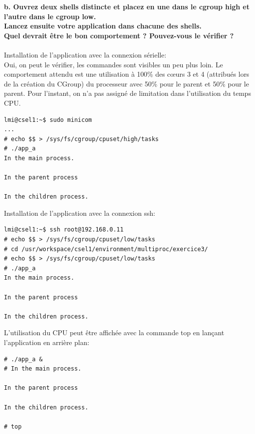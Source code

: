 \textbf{b. Ouvrez	deux	shells	distincte	et	placez en	une	dans	le	cgroup	high	et	l’autre	dans	le	cgroup	low.\\	
	Lancez	ensuite	votre	application	dans	chacune	des	shells.\\
	Quel	devrait	être	le	bon	comportement ?	Pouvez-vous	le	vérifier ?}\\\\
Installation de l'application avec la connexion sérielle: \\
Oui, on peut le vérifier, les commandes sont visibles un peu plus loin. Le comportement attendu est une utilisation à 100\% des cœurs 3 et 4 (attribués lors de la création du CGroup) du processeur avec 50\% pour le parent et 50\% pour le parent. Pour l'instant, on n'a pas assigné de limitation dans l'utilisation du temps CPU.
\begin{lstlisting}
lmi@csel1:~$ sudo minicom
...
# echo $$ > /sys/fs/cgroup/cpuset/high/tasks                                    
# ./app_a                                                                       
In the main process.                                                            

In the parent process                                                           

In the children process.  
\end{lstlisting}
Installation de l'application avec la connexion ssh: 
\begin{lstlisting}
lmi@csel1:~$ ssh root@192.168.0.11
# echo $$ > /sys/fs/cgroup/cpuset/low/tasks
# cd /usr/workspace/csel1/environment/multiproc/exercice3/
# echo $$ > /sys/fs/cgroup/cpuset/low/tasks    
# ./app_a 
In the main process.

In the parent process

In the children process.

\end{lstlisting}

L'utilisation du CPU peut être affichée avec la commande top en lançant l'application en arrière plan:
\begin{lstlisting}
# ./app_a &                                                                     
# In the main process.                                                          

In the parent process                                                           

In the children process.  

# top
\end{lstlisting}

